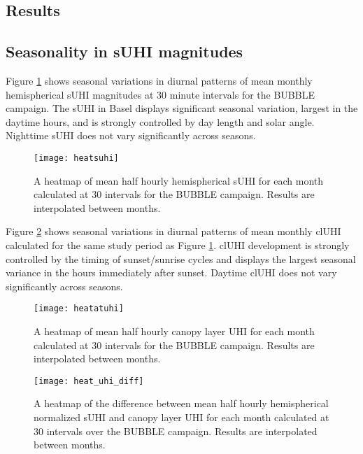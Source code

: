 \begin{bibunit}
\section{Results}

\subsection{Seasonality in sUHI magnitudes}

Figure \ref{heatsuhi} shows seasonal variations in diurnal patterns of mean monthly hemispherical sUHI magnitudes at 30 minute intervals for the BUBBLE campaign. The sUHI in Basel displays significant seasonal variation, largest in the daytime hours, and is strongly controlled by day length and solar angle. Nighttime sUHI does not vary significantly across seasons. 

\begin{figure}[H]
	\centering
	\texttt{[image: heatsuhi]}
	\caption{A heatmap of mean half hourly hemispherical sUHI for each month calculated at 30 \si{\min} intervals for the BUBBLE campaign. Results are interpolated between months.}
	\label{heatsuhi}
\end{figure}

Figure \ref{heatcluhi} shows seasonal variations in diurnal patterns of mean monthly clUHI calculated for the same study period as Figure \ref{heatsuhi}. clUHI development is strongly controlled by the timing of sunset/sunrise cycles and displays the largest seasonal variance in the hours immediately after sunset. Daytime clUHI does not vary significantly across seasons. 

\begin{figure}[H]
	\centering
	\texttt{[image: heatatuhi]}
	\caption{A heatmap of mean half hourly canopy layer UHI for each month calculated at 30 \si{\min} intervals for the BUBBLE campaign. Results are interpolated between months.}
	\label{heatcluhi}
\end{figure}

\begin{figure}[H]
	\centering
	\texttt{[image: heat\_uhi\_diff]}
	\caption{A heatmap of the difference between mean half hourly hemispherical normalized sUHI and canopy layer UHI for each month calculated at 30 \si{\min} intervals over the BUBBLE campaign. Results are interpolated between months.}
	\label{heat_uhi_diff}
\end{figure}


\end{bibunit}
